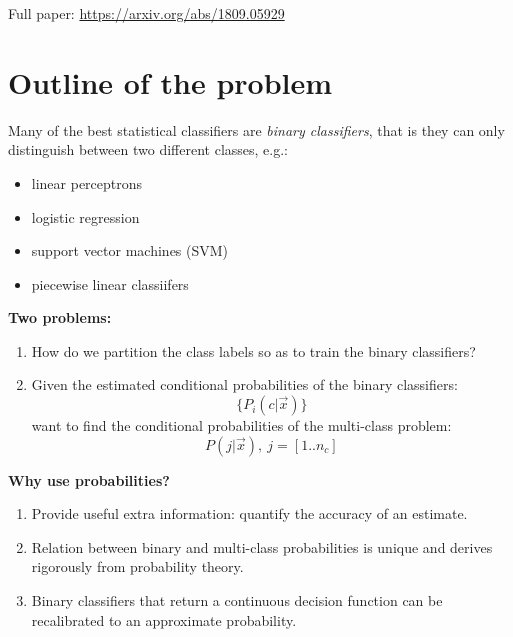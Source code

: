\documentclass[a0,landscape]{a0poster}
\begin{document}
\begin{multicols}{4}

\begin{abstract}
	
\end{abstract}

Full paper:	\url{https://arxiv.org/abs/1809.05929}

\section*{Outline of the problem}

Many of the best statistical classifiers are {\it binary classifiers}, that is
they can only distinguish between two different classes, e.g.:
\begin{itemize}
	\item linear perceptrons
	\item logistic regression \citep{Michie_etal1994}
	\item support vector machines (SVM) \citep{Mueller_etal2001}
	\item piecewise linear classiifers \citep{Mills2018}
\end{itemize}

	{\bf Two problems:}

	\begin{enumerate}
		\item How do we partition the class labels so as to train the binary classifiers?

\item Given the estimated conditional probabilities of the binary classifiers:
	\begin{equation*}
		\lbrace P_i(c | \vec x) \rbrace
	\end{equation*}
want to find the conditional probabilities of the multi-class problem:
	\begin{equation*}
		P(j | \vec x), ~ j=[1..n_c]
	\end{equation*}
	\end{enumerate}

	{\bf Why use probabilities?}

\begin{enumerate}
  \item Provide useful extra information: quantify the accuracy of an estimate.
  \item Relation between binary and multi-class probabilities is unique and derives rigorously from probability theory.
  \item Binary classifiers that return a continuous decision function can be recalibrated to an approximate probability.
\end{enumerate}


\end{multicols}
\end{document}
